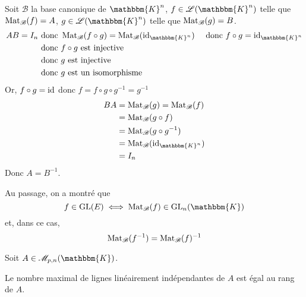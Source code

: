 \begin{prv}
	Soit $\mathcal{B}$ la base canonique de $\mathbbm{K}^n$, $f \in \mathcal{L}(\mathbbm{K}^n)$ telle que $\operatorname{Mat}_\mathcal{B}(f) = A$, $g \in \mathcal{L}(\mathbbm{K}^n)$ telle que $\operatorname{Mat}_{\mathcal{B}}(g) = B$.
	\begin{align*}
		AB = I_n &\text{ donc } \Mat_\mathcal{B}(f \circ g) = \Mat_\mathcal{B}(\id_{\mathbbm{K}^n})
						 &\text{ donc } f \circ g = \id_{\mathbbm{K}^n}\\
						 &\text{ donc } f \circ g \text{ est injective}\\
						 &\text{ donc } g \text{ est injective}\\
						 &\text{ donc } g \text{ est un isomorphisme}
	\end{align*}
	Or, $f \circ g = \operatorname{id}$ donc $f = f \circ g \circ g^{-1} = g^{-1}$
	\begin{align*}
		BA &= \Mat_\mathcal{B}(g) = \Mat_\mathcal{B}(f)\\
		&= \Mat_\mathcal{B}(g \circ f) \\
		&= \Mat_\mathcal{B}(g \circ g^{-1}) \\
		&= \Mat_\mathcal{B}(\id_{\mathbbm{K}^n}) \\
		&= I_n \\
	\end{align*}
	Donc $A = B^{-1}$.
\end{prv}

\begin{rmk}
	Au passage, on a montré que \[
		f \in \mathrm{GL}(E) \iff \Mat_\mathcal{B}(f) \in \mathrm{GL}_n(\mathbbm{K})
	\] et, dans ce cas, \[
		\operatorname{Mat}_\mathcal{B}(f^{-1}) = \operatorname{Mat}_\mathcal{B}(f)^{-1}
	\]
\end{rmk}

\begin{prop}
	Soit $A \in \mathcal{M}_{p,n}(\mathbbm{K})$.

	Le nombre maximal de lignes linéairement indépendantes de $A$ est égal au rang de $A$.
\end{prop}

